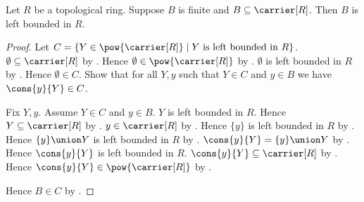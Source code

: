 \begin{theorem}\label{finite_subset_left_bounded}
    Let $R$ be a topological ring.
    Suppose $B$ is finite and $B\subseteq\carrier[R]$.
    Then $B$ is left bounded in $R$.
\end{theorem}
\begin{proof}
    Let $C=\{Y\in\pow{\carrier[R]}\mid
        \text{$Y$ is left bounded in $R$}\}$.
    $\emptyset\subseteq\carrier[R]$ by .
    Hence $\emptyset\in\pow{\carrier[R]}$ by .
    $\emptyset$ is left bounded in $R$ by .
    Hence $\emptyset\in C$.
    Show that for all $Y,y$ such that $Y\in C$ and $y\in B$ we have
        $\cons{y}{Y}\in C$.
    \begin{subproof}
        Fix $Y,y$.
        Assume $Y\in C$ and $y\in B$.
        $Y$ is left bounded in $R$.
        Hence $Y\subseteq\carrier[R]$ by .
        $y\in\carrier[R]$ by .
        Hence $\{y\}$ is left bounded in $R$ by
            .
        Hence $\{y\}\union Y$ is left bounded in $R$ by
            .
        $\cons{y}{Y}=\{y\}\union Y$ by
            .
        Hence $\cons{y}{Y}$ is left bounded in $R$.
        $\cons{y}{Y}\subseteq\carrier[R]$ by
            .
        Hence $\cons{y}{Y}\in\pow{\carrier[R]}$ by
            .
    \end{subproof}
    Hence $B\in C$ by .
\end{proof}

